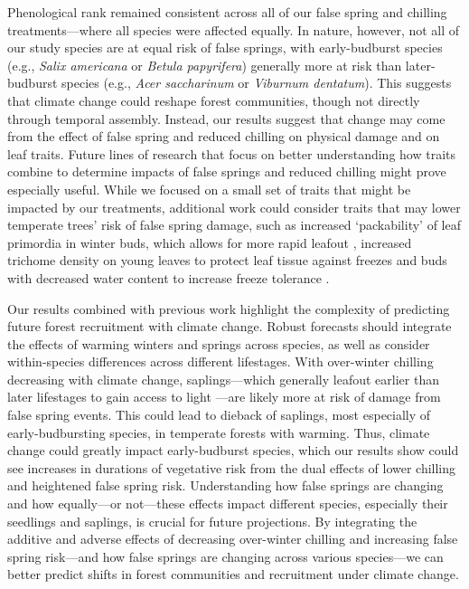 \documentclass{article}\usepackage[]{graphicx}\usepackage[]{color}
\begin{document}
\begin{enumerate}
Phenological rank remained consistent across all of our false spring and chilling treatments---where all species were affected equally. In nature, however, not all of our study species are at equal risk of false springs, with early-budburst species (e.g., \textit{Salix americana} or \textit{Betula papyrifera}) generally more at risk than later-budburst species (e.g., \textit{Acer saccharinum} or \textit{Viburnum dentatum}). This suggests that climate change could reshape forest communities, though not directly through temporal assembly. Instead, our results suggest that change may come from the effect of false spring and reduced chilling on physical damage and on leaf traits. Future lines of research that focus on better understanding how traits combine to determine impacts of false springs and reduced chilling might prove especially useful. While we focused on a small set of traits that might be impacted by our treatments, additional work could consider traits that may lower temperate trees' risk of false spring damage, such as increased `packability' of leaf primordia in winter buds, which allows for more rapid leafout \citep{Edwards2017}, increased trichome density on young leaves to protect leaf tissue against freezes \citep{Agrawal2004, Prozherina2003} and buds with decreased water content to increase freeze tolerance \citep{Beck2007, Hofmann2015, Kathke2011, Morin2007,  Muffler2016, Nielsen2009, Poirier2010}. %

Our results combined with previous work highlight the complexity of predicting future forest recruitment with climate change. Robust forecasts should integrate the effects of warming winters and springs across species, as well as consider within-species differences across different lifestages. With over-winter chilling decreasing with climate change, saplings---which generally leafout earlier than later lifestages to gain access to light \citep{Augspurger2009}---are likely more at risk of damage from false spring events. This could lead to dieback of saplings, most especially of early-budbursting species, in temperate forests with warming. Thus, climate change could greatly impact early-budburst species, which our results show could see increases in durations of vegetative risk from the dual effects of lower chilling and heightened false spring risk. Understanding how false springs are changing and how equally---or not---these effects impact different species, especially their seedlings and saplings, is crucial for future projections. By integrating the additive and adverse effects of decreasing over-winter chilling and increasing false spring risk---and how false springs are changing across various species---we can better predict shifts in forest communities and recruitment under climate change. 


\end{enumerate}
\end{document}
